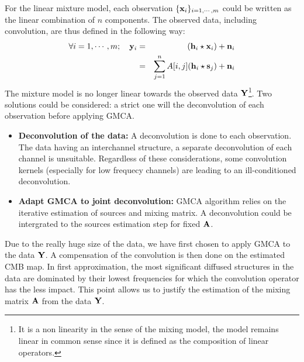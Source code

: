 For the linear mixture model, each observation $\{{\bf x}_i\}_{i=1,\cdots,m}$ could be written as the linear combination of $n$ components. The observed data, including convolution, 
are thus defined in the following way:
\begin{eqnarray}
\forall i=1,\cdots,m; \quad {\bf y}_i &  = & ({\bf h}_i \star {\bf x}_i) + {\bf n}_i \\
& = &  \sum_{j=1}^n A[i,j] ({\bf h}_i \star {\bf s}_j) + {\bf n}_i
\end{eqnarray}
The mixture model is no longer linear towards the observed data $\bf Y$\footnote{It is a non linearity in the sense of the mixing model, the model remains linear in common sense since it is defined as the composition of linear operators.}. Two solutions could be considered: a strict one will the deconvolution of each observation before applying GMCA.
\begin{itemize}
\item {\bf Deconvolution of the data:} A deconvolution is done to each observation. The data having an interchannel structure, a separate deconvolution of each channel is unsuitable. 
Regardless of these considerations, some convolution kernels (especially for low frequecy channels) are leading to an ill-conditioned deconvolution.
\item {\bf Adapt GMCA to joint deconvolution:} GMCA algorithm relies on the iterative estimation of sources and mixing matrix. A deconvolution could be intergrated to 
the sources estimation step for fixed $\bf A$.
\end{itemize}
Due to the really huge size of the data, we have first chosen to apply GMCA to the data $\bf Y$. A compensation of the convolution is then done on the estimated CMB map. In first approximation, 
the most significant diffused structures in the data are dominated by their lowest frequencies for which the convolution operator has the less impact. This point allows us to justify the estimation 
of the mixing matrix $\bf A$ from the data $\bf Y$.

